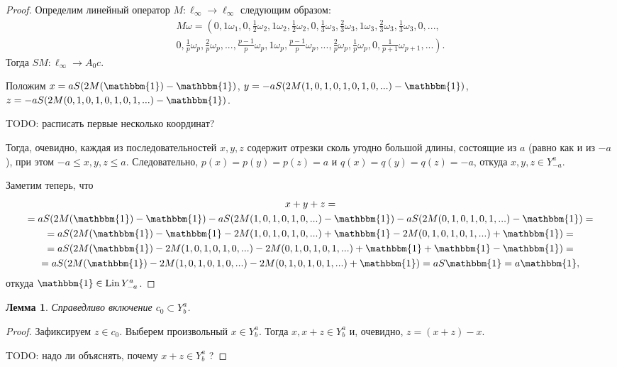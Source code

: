 \documentclass[a4paper,14pt]{article} %
\theoremstyle{plain}
\newtheorem{lemma}{Лемма}[section]
\begin{document}
\begin{proof}
	Определим линейный оператор $M:\ell_\infty \to \ell_\infty$ следующим образом:
	\begin{multline}
		M\omega=\left(
			0, 1\omega_1,
			0, \frac{1}{2}\omega_2, 1\omega_2, \frac{1}{2}\omega_2,
			0, \frac{1}{3}\omega_3, \frac{2}{3}\omega_3, 1\omega_3, \frac{2}{3}\omega_3, \frac{1}{3}\omega_3,
			0, ...,
		\right. \\ \left.
			0, \frac{1}{p}\omega_p, \frac{2}{p}\omega_p, ..., \frac{p-1}{p}\omega_p, 1\omega_p,
				\frac{p-1}{p}\omega_p, ..., \frac{2}{p}\omega_p, \frac{1}{p}\omega_p,
			0, \frac{1}{p+1}\omega_{p+1}, ...
		\right)
		.
	\end{multline}
	Тогда $SM: \ell_\infty \to A_0 c$.

	Положим $x=aS(2M(\mathbbm{1})-\mathbbm{1})$,
	$y=-aS(2M(1,0,1,0,1,0,1,0,...)-\mathbbm{1})$,
	$z=-aS(2M(0,1,0,1,0,1,0,1,...)-\mathbbm{1})$.

	TODO: расписать первые несколько координат?

	Тогда, очевидно, каждая из последовательностей $x,y,z$ содержит отрезки сколь угодно большой длины,
	состоящие из $a$ (равно как и из $-a$), при этом $-a \leq x,y,z \leq a$.
	Следовательно, $p(x)=p(y)=p(z) = a$ и $q(x)=q(y)=q(z) = -a$,
	откуда $x,y,z \in Y^a_{-a}$.

	Заметим теперь, что
	\begin{multline}
		x + y + z
		=
		\\=
		aS(2M(\mathbbm{1})-\mathbbm{1}) - aS(2M(1,0,1,0,1,0,...)-\mathbbm{1}) - aS(2M(0,1,0,1,0,1,...)-\mathbbm{1})
		=
		\\=
		aS(2M(\mathbbm{1})-\mathbbm{1}  -    2M(1,0,1,0,1,0,...)+\mathbbm{1}  -    2M(0,1,0,1,0,1,...)+\mathbbm{1})
		=
		\\=
		aS(2M(\mathbbm{1}) - 2M(1,0,1,0,1,0,...) - 2M(0,1,0,1,0,1,...)+\mathbbm{1}+\mathbbm{1}-\mathbbm{1})
		=
		\\=
		aS(2M(\mathbbm{1}) - 2M(1,0,1,0,1,0,...) - 2M(0,1,0,1,0,1,...)+\mathbbm{1})
		=
		aS\mathbbm{1}
		=
		a\mathbbm{1}
		,
	\end{multline}
	откуда $\mathbbm{1} \in \operatorname{Lin} Y^a_{-a}$.
\end{proof}


\begin{lemma}
	\label{lem:c_0_Lin_alpha_0}
	Справедливо включение $c_0 \subset Y^a_b$.
\end{lemma}

\begin{proof}
	Зафиксируем $z\in c_0$.
	Выберем произвольный $x \in Y^a_b$.
	Тогда $x, x+z\in Y^a_b$ и, очевидно, $z=(x+z)-x$.

	TODO: надо ли объяснять, почему $x+z\in Y^a_b$ ?
\end{proof}
\end{document}
